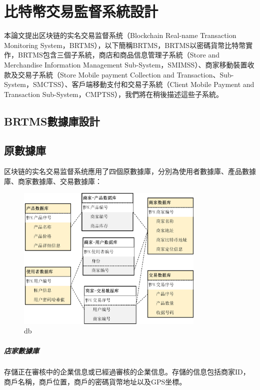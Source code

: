 
\chapter{比特幣交易監督系統設計}
本論文提出区块链的实名交易监督系统（Blockchain Real-name Transaction Monitoring System，BRTMS），以下簡稱BRTMS，BRTMS以密碼貨幣比特幣實作，BRTMS包含三個子系統，商店和商品信息管理子系統（Store and Merchandise Information Management Sub-System，SMIMSS）、商家移動裝置收款及交易子系統（Store Mobile payment Collection and Transaction、Sub-System，SMCTSS）、客戶端移動支付和交易子系統（Client Mobile Payment and Transaction Sub-System，CMPTSS），我們將在稍後描述這些子系統。

	\section{BRTMS數據庫設計}
		\section{原數據庫}
		区块链的实名交易监督系统應用了四個原數據庫，分別為使用者數據庫、產品數據庫、商家數據庫、交易數據庫：
		\begin{figure}[h]
			\centering
			\includegraphics[width = 0.8\textwidth]{db.png}
			\caption{db}\label{db}
		\end{figure}

			\paragraph{店家數據庫}存儲正在審核中的企業信息或已經過審核的企業信息。存儲的信息包括商家ID，商戶名稱，商戶位置，商戶的密碼貨幣地址以及GPS坐標。
